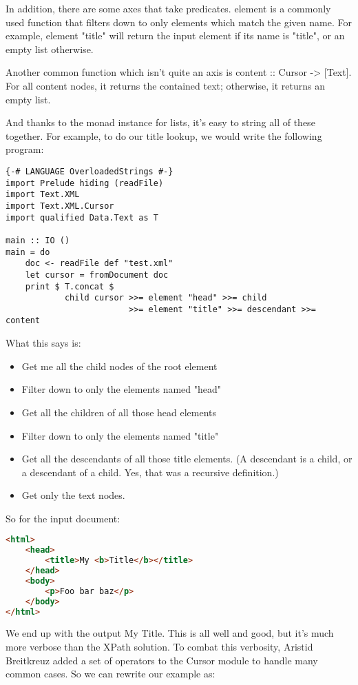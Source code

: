 \begin{itemize}
\begin{end}
In addition, there are some axes that take predicates. element is a commonly used function that filters down to only elements which match the given name. For example, element "title" will return the input element if its name is "title", or an empty list otherwise.

Another common function which isn't quite an axis is content :: Cursor -> [Text]. For all content nodes, it returns the contained text; otherwise, it returns an
empty list.

And thanks to the monad instance for lists, it's easy to string all of these together. For example, to do our title lookup, we would write the following program:

\begin{lstlisting}
{-# LANGUAGE OverloadedStrings #-}
import Prelude hiding (readFile)
import Text.XML
import Text.XML.Cursor
import qualified Data.Text as T

main :: IO ()
main = do
    doc <- readFile def "test.xml"
    let cursor = fromDocument doc
    print $ T.concat $
            child cursor >>= element "head" >>= child
                         >>= element "title" >>= descendant >>= content
\end{lstlisting}

What this says is:

\begin{itemize}
\item Get me all the child nodes of the root element
\item Filter down to only the elements named "head"
\item Get all the children of all those head elements
\item Filter down to only the elements named "title"
\item Get all the descendants of all those title elements. (A descendant is a child, or a descendant of a child. Yes, that was a recursive definition.)
\item Get only the text nodes.
\end{itemize}

So for the input document:

\begin{lstlisting}[language=HTML]
  <html>
    <head>
        <title>My <b>Title</b></title>
    </head>
    <body>
        <p>Foo bar baz</p>
    </body>
</html>
\end{lstlisting}

We end up with the output My Title. This is all well and good, but it's much more verbose than the XPath solution. To combat this verbosity, Aristid Breitkreuz added a set of operators to the Cursor module to handle many common cases. So we can rewrite our example as:


\end{end}
\end{itemize}
